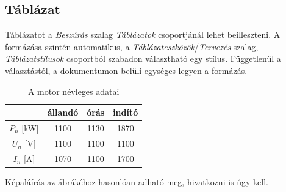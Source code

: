 \documentclass[a4paper, 12pt]{article}
\begin{document}
	\subsection{Táblázat}
	Táblázatot a \textit{\textcolor{bme}{Beszúrás}} szalag \textit{\textcolor{bme}{Táblázatok}} csoportjánál lehet beilleszteni.
	A formázása szintén automatikus, a \textit{\textcolor{bme}{Táblázateszközök}}/\textit{\textcolor{bme}{Tervezés}} szalag, \textit{\textcolor{bme}{Táblázatstílusok}} csoportból szabadon választható egy stílus.
	Függetlenül a választástól, a dokumentumon belüli egységes legyen a formázás.
	\begin{table}[h]
		\begin{center}
			\begin{tabular}{c|c|c|c}
				& állandó & órás & indító \\
				\hline
				$P_n$ [kW] & 1100 & 1130 & 1870 \\
				\hline
				$U_n$ [V] & 1100 & 1100 & 1100 \\
				\hline
				$I_n$ [A] & 1070 & 1100 & 1700 \\
			\end{tabular}
		\end{center}
		\caption{A motor névleges adatai \cite{BOOK:2}}
		\label{tab:motor}
    \end{table}
	Képaláírás az ábrákéhoz hasonlóan adható meg, hivatkozni is úgy kell.
\end{document}
